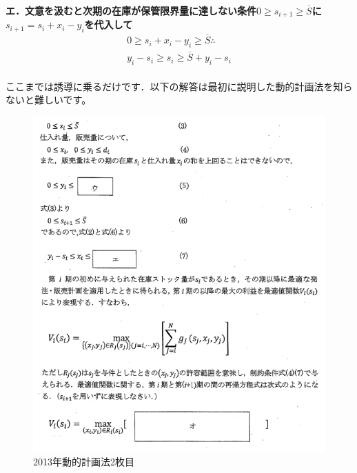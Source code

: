 \documentclass{jsarticle}
\begin{document}
\paragraph{エ．文意を汲むと次期の在庫が保管限界量に達しない条件$0\ge s_{i+1} \ge \overline{S}$に$s_{i+1}=s_i+x_i-y_i$を代入して
\begin{align*}
0 \ge s_i+x_i-y_i \ge \overline{S} \therefore
\\
y_i-s_i \ge s_i \ge \overline{S}+y_i-s_i
\end{align*}}

ここまでは誘導に乗るだけです．以下の解答は最初に説明した動的計画法を知らないと難しいです。

\begin{figure}[htbp]
  \includegraphics[keepaspectratio, width=16cm]{figures/dynamic20132.png}
  \caption{2013年動的計画法2枚目\label{dynamic20132}}
\end{figure}

\pagebreak
\end{document}
